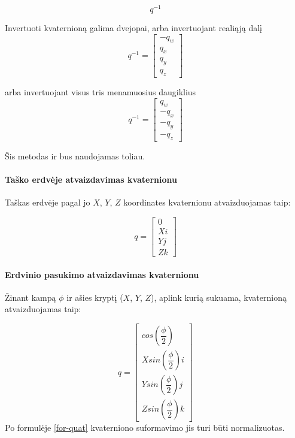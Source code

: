 \documentclass[12pt, a4paper, lithuanian, final]{article}
\begin{document}
\begin{equation}
	q^{-1}
\end{equation}

Invertuoti kvaternioną galima dvejopai, arba invertuojant realiąją dalį
\begin{equation}
	q^{-1} = \left[
		\begin{array}{c}
			-q_{w} \\
			q_{x} \\
			q_{y} \\
			q_{z}
		\end{array}
	\right]
\end{equation}

arba invertuojant visus tris menamuosius daugiklius
\begin{equation}
	q^{-1} = \left[
		\begin{array}{c}
			q_{w} \\
			-q_{x} \\
			-q_{y} \\
			-q_{z}
		\end{array}
	\right]
\end{equation}

Šis metodas ir bus naudojamas toliau.


\paragraph{Taško erdvėje atvaizdavimas kvaternionu}

Taškas erdvėje pagal jo $X$, $Y$, $Z$ koordinates kvaternionu atvaizduojamas taip:

\begin{equation}
	q = \left[
		\begin{array}{c}
			0\\
			Xi\\
			Yj\\
			Zk
		\end{array}
	\right]
\end{equation}


\paragraph{Erdvinio pasukimo atvaizdavimas kvaternionu}

Žinant kampą $\phi$ ir ašies kryptį ($X$, $Y$, $Z$), aplink kurią sukuama, kvaternioną atvaizduojamas taip:

\begin{equation}
	q = \left[
		\begin{array}{c}
			cos(\dfrac{\phi}{2})\\
			Xsin(\dfrac{\phi}{2})i\\
			Ysin(\dfrac{\phi}{2})j \\
			Zsin(\dfrac{\phi}{2})k
		\end{array}
	\right]
\label{for-quat}
\end{equation}
Po formulėje \ref{for-quat} kvaterniono suformavimo jis turi būti normalizuotas.
\end{document}
